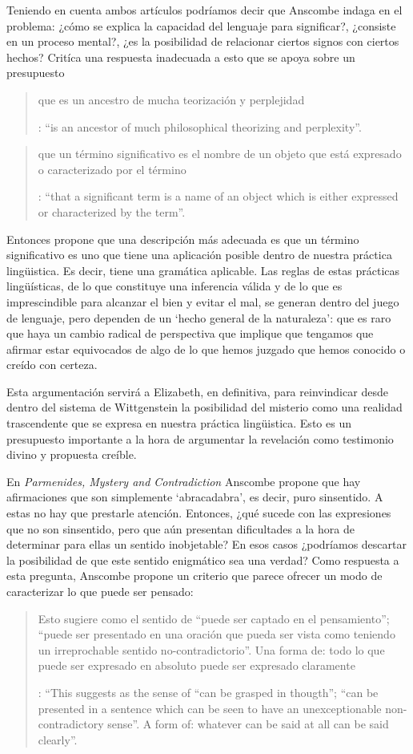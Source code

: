 Teniendo en cuenta ambos artículos podríamos decir que Anscombe indaga en el problema: ¿cómo se explica la capacidad del lenguaje para significar?, ¿consiste en un proceso mental?, ¿es la posibilidad de relacionar ciertos signos con ciertos hechos? Critíca una respuesta inadecuada a esto que se apoya sobre un presupuesto \blockquote[{\cite[xi]{anscombe1981parmenides}}: \enquote{is an ancestor of much philosophical theorizing and perplexity}.]{que es un ancestro de mucha teorización y perplejidad}: \blockquote[{\cite[x]{anscombe1981parmenides}}: \enquote{that a significant term is a name of an object which is either expressed or characterized by the term}.]{que un término significativo es el nombre de un objeto que está expresado o caracterizado por el término}. Entonces propone que una descripción más adecuada es que un término significativo es uno que tiene una aplicación posible dentro de nuestra práctica lingüistica. Es decir, tiene una gramática aplicable. Las reglas de estas prácticas lingüísticas, de lo que constituye una inferencia válida y de lo que es imprescindible para alcanzar el bien y evitar el mal, se generan dentro del juego de lenguaje, pero dependen de un `hecho general de la naturaleza':  que es raro que haya un cambio radical de perspectiva que implique que tengamos que afirmar estar equivocados de algo de lo que hemos juzgado que hemos conocido o creído con certeza.

Esta argumentación servirá a Elizabeth, en definitiva, para reinvindicar desde dentro del sistema de Wittgenstein la posibilidad del misterio como una realidad trascendente que se expresa en nuestra práctica lingüistica. Esto es un presupuesto importante a la hora de argumentar la revelación como testimonio divino y propuesta creíble.

En \emph{Parmenides, Mystery and Contradiction} Anscombe propone que hay afirmaciones que son simplemente `abracadabra', es decir, puro sinsentido. A estas no hay que prestarle atención. Entonces, ¿qué sucede con las expresiones que no son sinsentido, pero que aún presentan dificultades a la hora de determinar para ellas un sentido inobjetable? En esos casos ¿podríamos descartar la posibilidad de que este sentido enigmático sea una verdad? Como respuesta a esta pregunta, Anscombe propone un criterio que parece ofrecer un modo de caracterizar lo que puede ser pensado: \blockquote[{\Cite[8]{anscombe1981parmenides:pmc}}: \enquote{This suggests as the sense of ``can be grasped in thougth''; ``can be presented in a sentence which can be seen to have an unexceptionable non-contradictory sense''. A form of: whatever can be said at all can be said clearly}.]{Esto sugiere como el sentido de ``puede ser captado en el pensamiento''; ``puede ser presentado en una oración que pueda ser vista como teniendo un irreprochable sentido no-contradictorio''. Una forma de: todo lo que puede ser expresado en absoluto puede ser expresado claramente}.

